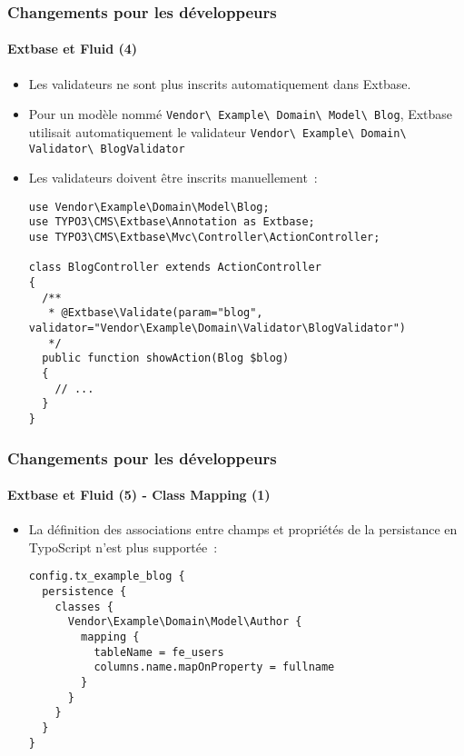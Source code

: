 \begin{frame}[fragile]
	\frametitle{Changements pour les développeurs}
	\framesubtitle{Extbase et Fluid (4)}

	\lstset{basicstyle=\tiny\ttfamily}

	\begin{itemize}
		\item Les validateurs ne sont plus inscrits automatiquement dans Extbase.
		\item Pour un modèle nommé
			\small\texttt{Vendor\textbackslash
				Example\textbackslash
				Domain\textbackslash
				Model\textbackslash
				Blog}\normalsize,\newline
			Extbase utilisait automatiquement le validateur
			\small\texttt{Vendor\textbackslash
				Example\textbackslash
				Domain\textbackslash
				Validator\textbackslash
				BlogValidator}\normalsize

		\item Les validateurs doivent être inscrits manuellement~:

\begin{lstlisting}
use Vendor\Example\Domain\Model\Blog;
use TYPO3\CMS\Extbase\Annotation as Extbase;
use TYPO3\CMS\Extbase\Mvc\Controller\ActionController;

class BlogController extends ActionController
{
  /**
   * @Extbase\Validate(param="blog", validator="Vendor\Example\Domain\Validator\BlogValidator")
   */
  public function showAction(Blog $blog)
  {
    // ...
  }
}
\end{lstlisting}

	\end{itemize}

\end{frame}


\begin{frame}[fragile]
	\frametitle{Changements pour les développeurs}
	\framesubtitle{Extbase et Fluid (5) - Class Mapping (1)}

	\lstset{basicstyle=\tiny\ttfamily}

	\begin{itemize}
		\item La définition des associations entre champs et propriétés de la persistance en TypoScript
			n'est plus supportée~:

\begin{lstlisting}
config.tx_example_blog {
  persistence {
    classes {
      Vendor\Example\Domain\Model\Author {
        mapping {
          tableName = fe_users
          columns.name.mapOnProperty = fullname
        }
      }
    }
  }
}
\end{lstlisting}

	\end{itemize}

\end{frame}

